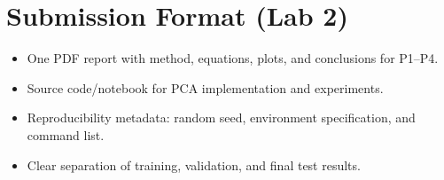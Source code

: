 \section*{Submission Format (Lab 2)}
\begin{itemize}
  \item One PDF report with method, equations, plots, and conclusions for P1--P4.
  \item Source code/notebook for PCA implementation and experiments.
  \item Reproducibility metadata: random seed, environment specification, and command list.
  \item Clear separation of training, validation, and final test results.
\end{itemize}
